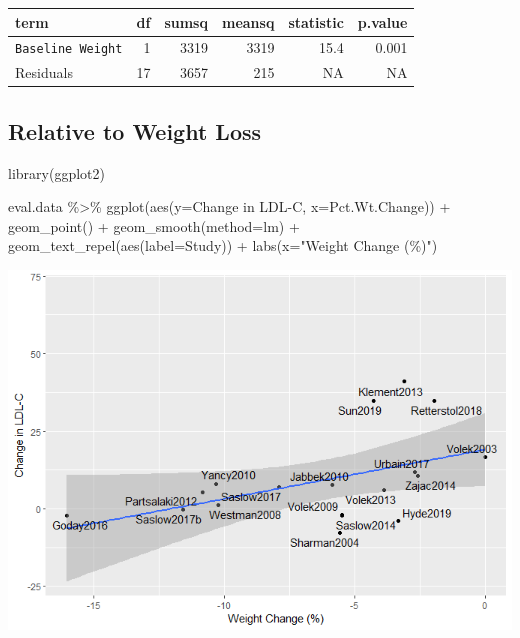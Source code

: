 \documentclass[
]{article}
\newenvironment{Shaded}{\begin{snugshade}}{\end{snugshade}}
\newcommand{\AttributeTok}[1]{\textcolor[rgb]{0.77,0.63,0.00}{#1}}
\newcommand{\FunctionTok}[1]{\textcolor[rgb]{0.00,0.00,0.00}{#1}}
\newcommand{\NormalTok}[1]{#1}
\newcommand{\SpecialCharTok}[1]{\textcolor[rgb]{0.00,0.00,0.00}{#1}}
\newcommand{\StringTok}[1]{\textcolor[rgb]{0.31,0.60,0.02}{#1}}
\begin{document}
\begin{longtable}[]{@{}lrrrrr@{}}
\toprule
term & df & sumsq & meansq & statistic & p.value \\
\midrule
\endhead
\texttt{Baseline\ Weight} & 1 & 3319 & 3319 & 15.4 & 0.001 \\
Residuals & 17 & 3657 & 215 & NA & NA \\
\bottomrule
\end{longtable}

\hypertarget{relative-to-weight-loss}{%
\subsection{Relative to Weight Loss}\label{relative-to-weight-loss}}

\begin{Shaded}
\begin{Highlighting}[]
\FunctionTok{library}\NormalTok{(ggplot2)}

\NormalTok{eval.data }\SpecialCharTok{\%\textgreater{}\%}
  \FunctionTok{ggplot}\NormalTok{(}\FunctionTok{aes}\NormalTok{(}\AttributeTok{y=}\StringTok{\textasciigrave{}}\AttributeTok{Change in LDL{-}C}\StringTok{\textasciigrave{}}\NormalTok{,}
             \AttributeTok{x=}\NormalTok{Pct.Wt.Change)) }\SpecialCharTok{+}
  \FunctionTok{geom\_point}\NormalTok{() }\SpecialCharTok{+}
  \FunctionTok{geom\_smooth}\NormalTok{(}\AttributeTok{method=}\StringTok{\textquotesingle{}lm\textquotesingle{}}\NormalTok{) }\SpecialCharTok{+}
  \FunctionTok{geom\_text\_repel}\NormalTok{(}\FunctionTok{aes}\NormalTok{(}\AttributeTok{label=}\NormalTok{Study)) }\SpecialCharTok{+}
  \FunctionTok{labs}\NormalTok{(}\AttributeTok{x=}\StringTok{"Weight Change (\%)"}\NormalTok{)}
\end{Highlighting}
\end{Shaded}

\includegraphics{figures/ldl-change-vs-weight-change-1.png}
\end{document}
